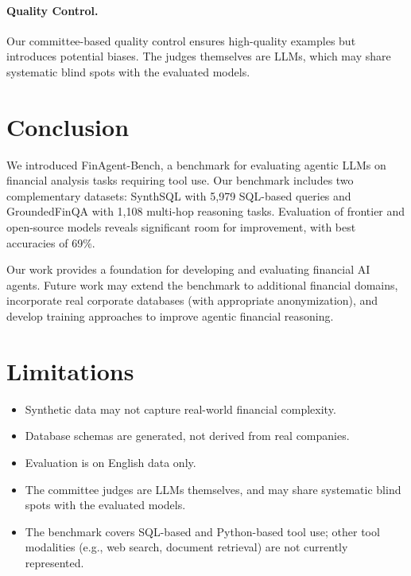 \documentclass[11pt]{article}
\newcommand{\datasetname}{FinAgent-Bench\xspace}
\newcommand{\synthsubset}{SynthSQL\xspace}
\newcommand{\groundedfinqa}{GroundedFinQA\xspace}
\begin{document}
\paragraph{Quality Control.}
Our committee-based quality control ensures high-quality examples but introduces potential biases. The judges themselves are LLMs, which may share systematic blind spots with the evaluated models.

\section{Conclusion}

We introduced \datasetname, a benchmark for evaluating agentic LLMs on financial analysis tasks requiring tool use. Our benchmark includes two complementary datasets: \synthsubset with 5,979 SQL-based queries and \groundedfinqa with 1,108 multi-hop reasoning tasks. Evaluation of frontier and open-source models reveals significant room for improvement, with best accuracies of 69\%.

Our work provides a foundation for developing and evaluating financial AI agents. Future work may extend the benchmark to additional financial domains, incorporate real corporate databases (with appropriate anonymization), and develop training approaches to improve agentic financial reasoning.

\section*{Limitations}

\begin{itemize}
    \item Synthetic data may not capture real-world financial complexity.
    \item Database schemas are generated, not derived from real companies.
    \item Evaluation is on English data only.
    \item The committee judges are LLMs themselves, and may share systematic blind spots with the evaluated models.
    \item The benchmark covers SQL-based and Python-based tool use; other tool modalities (e.g., web search, document retrieval) are not currently represented.
\end{itemize}
\end{document}
